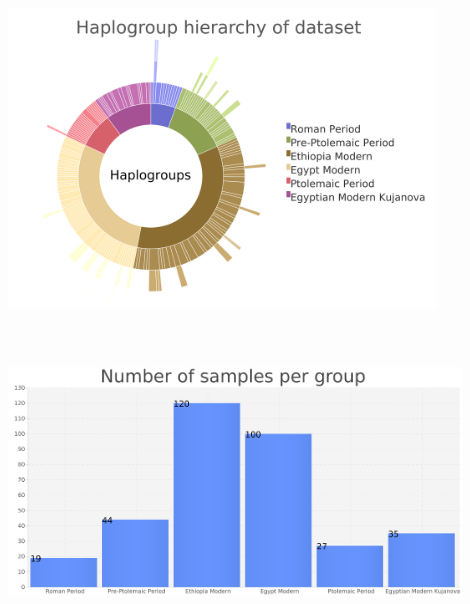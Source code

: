 \documentclass[a0paper,portrait]{baposter}
\begin{document}
\begin{poster}
{	\vspace{2em}

	\begin{minipage}[t]{0.5\textwidth}
		\textbf{}\\
		\includegraphics[width=0.85\textwidth, center]{figures/sunburst3.png}
	\end{minipage}
	\hspace{0.5em}
	\begin{minipage}[t]{0.5\textwidth}
		\textbf{}\\
		\\
		\includegraphics[width=0.9\textwidth, left]{figures/group_sizes.png}
	\end{minipage}

}




\end{poster}
\end{document}
